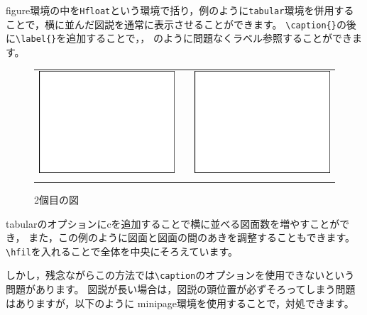 \begin{Appendix}
\noindent
figure環境の中を\verb|Hfloat|という環境で括り，例のように\verb|tabular|環境を併用することで，横に並んだ図説を通常に表示させることができます。
\verb|\caption{}|の後に\verb|\label{}|を追加することで，，
のように問題なくラベル参照することができます。

\begin{figure}[tbhp]
\begin{Hfloat}
\hfil
\begin{tabular}{ccc}
\includegraphics{square.eps} &
\hspace{8mm} &
\includegraphics{square.eps} \\
\caption{1個目の図}\label{figA.1} &
\hspace{8mm} &
\caption{2個目の図}\label{figA.2}
\end{tabular}
\end{Hfloat}
\end{figure}

tabularのオプションにcを追加することで横に並べる図面数を増やすことができ，
また，この例のように図面と図面の間のあきを調整することもできます。
\verb|\hfil|を入れることで全体を中央にそろえています。

しかし，残念ながらこの方法では\verb|\caption|のオプションを使用できないという問題があります。
図説が長い場合は，図説の頭位置が必ずそろってしまう問題はありますが，以下のように
minipage環境を使用することで，対処できます。


\end{Appendix}
